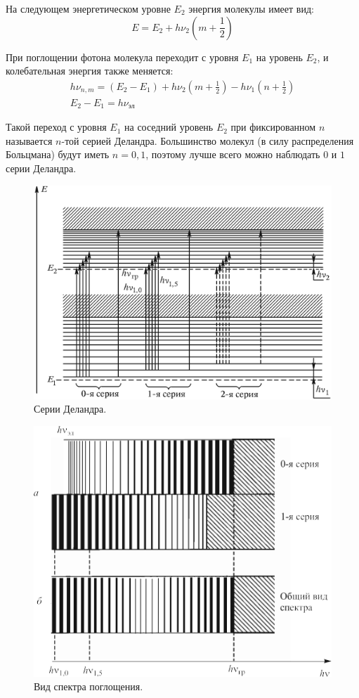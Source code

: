 \documentclass[12pt]{article}
\begin{document}
На следующем энергетическом уровне $E_2$ энергия молекулы имеет вид:
\begin{equation*}
    E = E_2 + h \nu_2 (m + \frac{1}{2})
\end{equation*}

При поглощении фотона молекула переходит с уровня $E_1$ на уровень $E_2$,
и колебательная энергия также меняется:
\begin{gather*}
    h \nu_{n, m} = (E_2 - E_1) + h \nu_2 (m + \frac{1}{2}) - h \nu_1 (n + \frac{1}{2}) \\
    E_2 - E_1 = h \nu_{\text{эл}}
\end{gather*}

Такой переход с уровня $E_1$ на соседний уровень $E_2$ при фиксированном $n$ называется $n$-той серией Деландра.
Большинство молекул (в силу распределения Больцмана) будут иметь $n = 0, 1$, поэтому лучше всего можно наблюдать
$0$ и $1$ серии Деландра.

\begin{figure}[H]
    \caption{Серии Деландра.}
    \centering
    \includegraphics[width=0.75\linewidth]{struct2.png}
\end{figure}

\begin{figure}[H]
    \caption{Вид спектра поглощения.}
    \centering
    \includegraphics[width=0.6\linewidth]{spec.png}
\end{figure}
\end{document}
